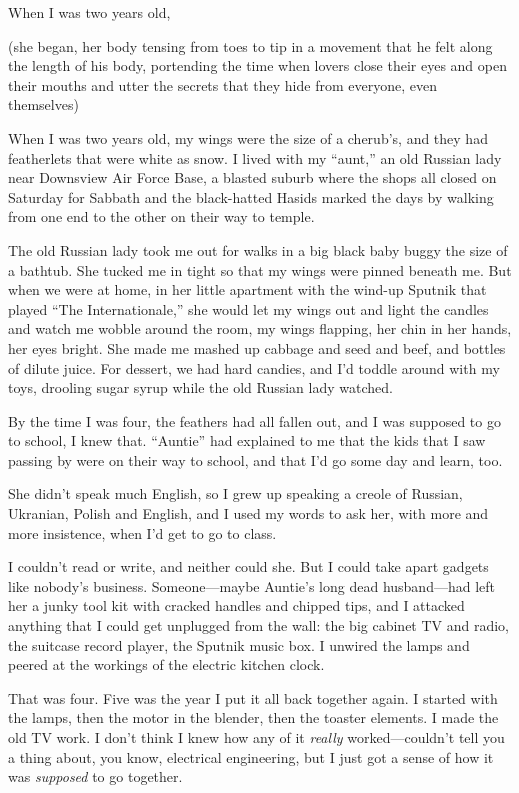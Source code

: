 \documentclass{article}
\begin{document}
When I was two years old,

(she began, her body tensing from toes to tip in a movement that he
felt along the length of his body, portending the time when lovers
close their eyes and open their mouths and utter the secrets that they
hide from everyone, even themselves)

When I was two years old, my wings were the size of a cherub's, and
they had featherlets that were white as snow.  I lived with my
``aunt,'' an old Russian lady near Downsview Air Force Base, a blasted
suburb where the shops all closed on Saturday for Sabbath and the
black-hatted Hasids marked the days by walking from one end to the
other on their way to temple.

The old Russian lady took me out for walks in a big black baby buggy
the size of a bathtub.  She tucked me in tight so that my wings were
pinned beneath me.  But when we were at home, in her little apartment
with the wind-up Sputnik that played ``The Internationale,'' she would
let my wings out and light the candles and watch me wobble around the
room, my wings flapping, her chin in her hands, her eyes bright.  She
made me mashed up cabbage and seed and beef, and bottles of dilute
juice.  For dessert, we had hard candies, and I'd toddle around with
my toys, drooling sugar syrup while the old Russian lady watched.

By the time I was four, the feathers had all fallen out, and I was
supposed to go to school, I knew that.  ``Auntie'' had explained to me
that the kids that I saw passing by were on their way to school, and
that I'd go some day and learn, too.

She didn't speak much English, so I grew up speaking a creole of
Russian, Ukranian, Polish and English, and I used my words to ask her,
with more and more insistence, when I'd get to go to class.

I couldn't read or write, and neither could she.  But I could take
apart gadgets like nobody's business.  Someone---maybe Auntie's long
dead husband---had left her a junky tool kit with cracked handles and
chipped tips, and I attacked anything that I could get unplugged from
the wall:  the big cabinet TV and radio, the suitcase record player,
the Sputnik music box.  I unwired the lamps and peered at the workings
of the electric kitchen clock.

That was four.  Five was the year I put it all back together again.  I
started with the lamps, then the motor in the blender, then the
toaster elements.  I made the old TV work.  I don't think I knew how
any of it \textit{really} worked---couldn't tell you a thing about,
you know, electrical engineering, but I just got a sense of how it was
\textit{supposed} to go together.
\end{document}
